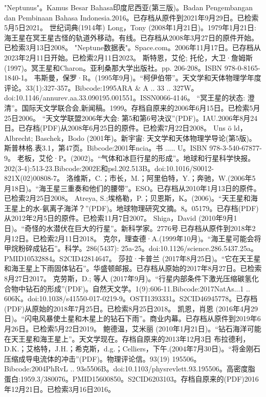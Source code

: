 \begin{enumerate}
 "Neptunus"。Kamus Besar Bahasa印度尼西亚(第三版)。Badan Pengembangan dan Pembinaan Bahasa Indonesia.2016。已存档从原件到2021年9月29日。已检索5月5日2021。
 世纪词典(1914年)
 Long，Tony (2008年1月21日)。1979年1月21日: 海王星在冥王星古怪的轨道外移动。有线。已存档从2008年3月27日的原件开始。已检索3月13日2008。
 "Neptune数据表"。Space.com。2006年11月17日。已存档从2023年2月11日开始。已检索2月11日2023。
 斯特恩，艾伦; 托伦，大卫·詹姆斯 (1997)。冥王星和Charon。亚利桑那大学出版社。pp. 206-208。ISBN 978-0-8165-1840-1。
 韦斯曼，保罗·R。(1995年9月)。“柯伊伯带”。天文学和天体物理学年度评论。33(1):327-357。Bibcode:1995ARA & A .. 33 .. 327W。doi:10.1146/annurev.aa.33.090195.001551。ISSN0066-4146。 
 “冥王星的状态: 澄清”。国际天文学联合会,新闻稿。1999。存档自原来的2006年6月15日。已检索5月25日2006。
 “天文学联盟2006年大会: 第5和第6号决议”(PDF)。IAU.2006年8月24日。已存档(PDF)从2008年6月25日的原件。已检索7月22日2008。
 Uns ö ld，Albrecht; Baschek，Bodo (2001年)。新宇宙: 天文学和天体物理学导论(第5版)。斯普林格.表3.1，第47页。Bibcode:2001年ncia。书 ..... U。ISBN  978-3-540-67877-9。
 老板，艾伦·P。(2002)。“气体和冰巨行星的形成”。地球和行星科学快报。202(3-4):513-23.Bibcode:2002E和psl.202.513B。doi:10.1016/S0012-821X(02)00808-7。
 洛维斯，C.；市长，M.；阿里伯特，Y.；奔驰，W.(2006年5月18日)。“海王星三重奏和他们的腰带”。ESO。已存档从2010年1月13日的原件。已检索2月25日2008。
 Atreya, S.;埃格勒，P.；贝恩斯，K。(2006)。“天王星和海王星上的水-氨离子海洋？”(PDF)。地球物理研究文摘。8。05179。已存档(PDF)从2012年2月5日的原件。已检索11月7日2007。
 Shiga，David (2010年9月1日)。“奇怪的水潜伏在巨大的行星”。新科学家。2776号.已存档从原件到2018年2月12日。已检索2月11日2018。
 克尔，理查德·A.(1999年10月)。“海王星可能会将甲烷粉碎成钻石”。科学。286(5437): 25a-25。doi:10.1126/science.286.5437.25a。PMID10532884。S2CID42814647。  
 莎拉·卡普兰 (2017年8月25日)。“它在天王星和海王星上下雨固体钻石”。华盛顿邮报。已存档从原始的2017年8月27日。已检索8月27日2017。
 克劳斯，D.; 等人 (2017年9月)。“行星内部条件下激光压缩碳氢化合物中钻石的形成”(PDF)。自然天文学。1(9):606-11.Bibcode:2017NatAs...1 .. 606K。doi:10.1038/s41550-017-0219-9。OSTI1393331。S2CID46945778。已存档(PDF)从原始的2018年7月25日。已检索8月25日2018。   
 凯恩，肖恩 (2016年4月29日)。“闪电风暴使土星和木星上的钻石下雨”。商业内幕。已存档从原件到2019年6月26日。已检索5月22日2019。
 鲍德温，艾米丽 (2010年1月21日)。“钻石海洋可能在天王星和海王星上”。天文学现在。存档自原来的2013年12月3日
 布拉德利，D.K.；艾格特，J.H.；希克斯，d.g.；Celliers，下午.(2004年7月30日)。“将金刚石压缩成导电流体的冲击”(PDF)。物理评论信。93(19) 195506。Bibcode:2004PhRvL .. 93s5506B。doi:10.1103/physrevlett.93.195506。高密度脂蛋白:1959.3/380076。PMID15600850。S2CID6203103。存档自原来的(PDF)2016年12月21日。已检索3月16日2016。   

\end{enumerate}
